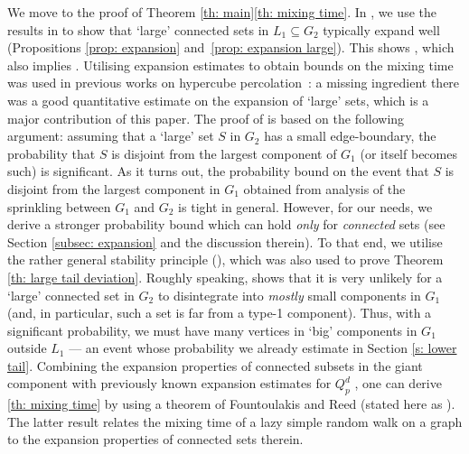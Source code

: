 \documentclass[reqno,final,a4paper]{amsart}
\theoremstyle{definition}
\newcommand{\1}{\mathbbm{1}}
\begin{document}
We move to the proof of Theorem \ref{th: main}\ref{th: mixing time}. 
In , we use the results in  to show that `large' connected sets in $L_1\subseteq G_2$ typically expand well (Propositions \ref{prop: expansion} and~\ref{prop: expansion large}). 
This shows , which also implies .
Utilising expansion estimates to obtain bounds on the mixing time was used in previous works on hypercube percolation~\cite{DEKK24, EKK22}: a missing ingredient there was a good quantitative estimate on the expansion of `large' sets, which is a major contribution of this paper. 
The proof of  is based on the following argument: assuming that a `large' set $S$ in $G_2$ has a small edge-boundary, the probability that $S$ is disjoint from the largest component of $G_1$ (or itself becomes such) is significant. 
As it turns out, the probability bound on the event that $S$ is disjoint from the largest component in $G_1$ obtained from analysis of the sprinkling between $G_1$ and $G_2$ is tight in general. However, for our needs, we derive a stronger probability bound which can hold \textit{only} for \textit{connected} sets (see Section \ref{subsec: expansion} and the discussion therein). To that end, we utilise the rather general stability principle (), which was also used to prove Theorem \ref{th: large tail deviation}. 
Roughly speaking,  shows that it is very unlikely for a `large' connected set in $G_2$ to disintegrate into \textit{mostly} small components in $G_1$ (and, in particular, such a set is far from a type-1 component). Thus, with a significant probability, we must have many vertices in `big' components in $G_1$ outside $L_1$ --- an event whose probability we already estimate in Section \ref{s: lower tail}.
Combining the expansion properties of connected subsets in the giant component with previously known expansion estimates for $Q^d_p$ \cite{DEKK24}, one can derive \ref{th: mixing time} by using a theorem of Fountoulakis and Reed \cite{FR07a} (stated here as ). 
The latter result relates the mixing time of a lazy simple random walk on a graph to the expansion properties of connected sets therein.
\end{document}
